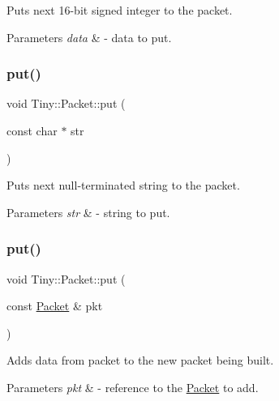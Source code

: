 Puts next 16-\/bit signed integer to the packet. 
\begin{DoxyParams}{Parameters}
{\em data} & -\/ data to put. \\
\hline
\end{DoxyParams}
\mbox{\label{classTiny_1_1Packet_a6b5880ebffa02df3a380a270809433e1}} 
\subsubsection{\texorpdfstring{put()}{put()}\hspace{0.1cm}{\footnotesize\ttfamily [6/7]}}
{\footnotesize\ttfamily void Tiny\+::\+Packet\+::put (\begin{DoxyParamCaption}\item[{const char $\ast$}]{str }\end{DoxyParamCaption})\hspace{0.3cm}{\ttfamily [inline]}}

Puts next null-\/terminated string to the packet. 
\begin{DoxyParams}{Parameters}
{\em str} & -\/ string to put. \\
\hline
\end{DoxyParams}
\mbox{\label{classTiny_1_1Packet_a5741e3aec04c9100ce00a6b702417231}} 
\subsubsection{\texorpdfstring{put()}{put()}\hspace{0.1cm}{\footnotesize\ttfamily [7/7]}}
{\footnotesize\ttfamily void Tiny\+::\+Packet\+::put (\begin{DoxyParamCaption}\item[{const \hyperlink{classTiny_1_1Packet}{Packet} \&}]{pkt }\end{DoxyParamCaption})\hspace{0.3cm}{\ttfamily [inline]}}

Adds data from packet to the new packet being built. 
\begin{DoxyParams}{Parameters}
{\em pkt} & -\/ reference to the \hyperlink{classTiny_1_1Packet}{Packet} to add. \\
\hline
\end{DoxyParams}
\mbox{\label{classTiny_1_1Packet_ae8764bf70fd6f09df2cb15c02ce2aa30}} 
